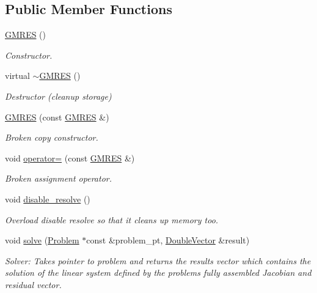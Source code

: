 \subsection*{Public Member Functions}
\begin{DoxyCompactItemize}
\item 
\hyperlink{classoomph_1_1GMRES_a6f19644223af4b8f2fb9f327239b6497}{G\+M\+R\+ES} ()
\begin{DoxyCompactList}\small\item\em Constructor. \end{DoxyCompactList}\item 
virtual \hyperlink{classoomph_1_1GMRES_a9760251d952af2d5f2c47c90235d45d5}{$\sim$\+G\+M\+R\+ES} ()
\begin{DoxyCompactList}\small\item\em Destructor (cleanup storage) \end{DoxyCompactList}\item 
\hyperlink{classoomph_1_1GMRES_a30aad2a03ce6a42afb9a73628518fdab}{G\+M\+R\+ES} (const \hyperlink{classoomph_1_1GMRES}{G\+M\+R\+ES} \&)
\begin{DoxyCompactList}\small\item\em Broken copy constructor. \end{DoxyCompactList}\item 
void \hyperlink{classoomph_1_1GMRES_a01ff65b52b1a05602372ccc543b62935}{operator=} (const \hyperlink{classoomph_1_1GMRES}{G\+M\+R\+ES} \&)
\begin{DoxyCompactList}\small\item\em Broken assignment operator. \end{DoxyCompactList}\item 
void \hyperlink{classoomph_1_1GMRES_a5297a6d4f978e601989990eee1333b64}{disable\+\_\+resolve} ()
\begin{DoxyCompactList}\small\item\em Overload disable resolve so that it cleans up memory too. \end{DoxyCompactList}\item 
void \hyperlink{classoomph_1_1GMRES_ade0f569ecda6b63d3e77dfe07a19cb13}{solve} (\hyperlink{classoomph_1_1Problem}{Problem} $\ast$const \&problem\+\_\+pt, \hyperlink{classoomph_1_1DoubleVector}{Double\+Vector} \&result)
\begin{DoxyCompactList}\small\item\em Solver\+: Takes pointer to problem and returns the results vector which contains the solution of the linear system defined by the problem\textquotesingle{}s fully assembled Jacobian and residual vector. \end{DoxyCompactList}\item 

\end{DoxyCompactItemize}
